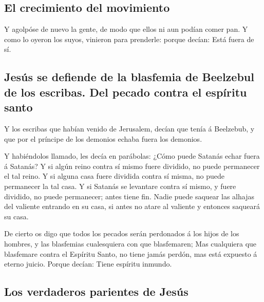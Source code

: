 \hypertarget{el-crecimiento-del-movimiento}{%
\subsection{El crecimiento del
movimiento}\label{el-crecimiento-del-movimiento}}

 Y agolpóse de nuevo la gente, de modo que ellos ni aun
podían comer pan.  Y como lo oyeron los suyos, vinieron
para prenderle: porque decían: Está fuera de sí.

\hypertarget{jesuxfas-se-defiende-de-la-blasfemia-de-beelzebul-de-los-escribas.-del-pecado-contra-el-espuxedritu-santo}{%
\subsection{Jesús se defiende de la blasfemia de Beelzebul de los
escribas. Del pecado contra el espíritu
santo}\label{jesuxfas-se-defiende-de-la-blasfemia-de-beelzebul-de-los-escribas.-del-pecado-contra-el-espuxedritu-santo}}

 Y los escribas que habían venido de Jerusalem, decían
que tenía á Beelzebub, y que por el príncipe de los demonios echaba
fuera los demonios.

 Y habiéndolos llamado, les decía en parábolas: ¿Cómo
puede Satanás echar fuera á Satanás?  Y si algún reino
contra sí mismo fuere dividido, no puede permanecer el tal reino.
 Y si alguna casa fuere dividida contra sí misma, no
puede permanecer la tal casa.  Y si Satanás se levantare
contra sí mismo, y fuere dividido, no puede permanecer; antes tiene fin.
 Nadie puede saquear las alhajas del valiente entrando en
su casa, si antes no atare al valiente y entonces saqueará su casa.

 De cierto os digo que todos los pecados serán perdonados
á los hijos de los hombres, y las blasfemias cualesquiera con que
blasfemaren;  Mas cualquiera que blasfemare contra el
Espíritu Santo, no tiene jamás perdón, mas está expuesto á eterno
juicio.  Porque decían: Tiene espíritu inmundo.

\hypertarget{los-verdaderos-parientes-de-jesuxfas}{%
\subsection{Los verdaderos parientes de
Jesús}\label{los-verdaderos-parientes-de-jesuxfas}}

